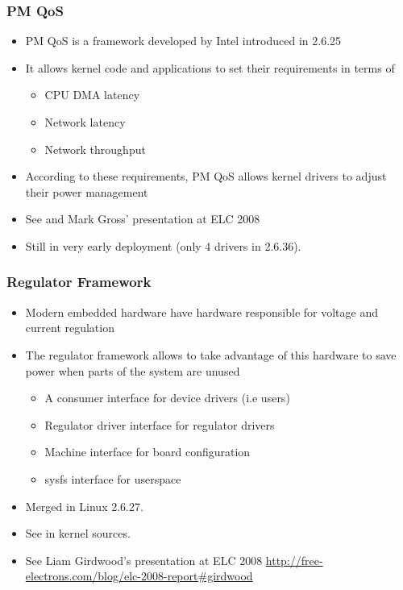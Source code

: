 \begin{frame}
  \frametitle{PM QoS}
  \begin{itemize}
  \item PM QoS is a framework developed by Intel introduced in 2.6.25
  \item It allows kernel code and applications to set their
    requirements in terms of
    \begin{itemize}
    \item CPU DMA latency
    \item Network latency
    \item Network throughput
    \end{itemize}
  \item According to these requirements, PM QoS allows kernel drivers
    to adjust their power management
  \item See  and Mark
    Gross' presentation at ELC 2008
  \item Still in very early deployment (only 4 drivers in 2.6.36).
  \end{itemize}
\end{frame}

\begin{frame}
  \frametitle{Regulator Framework}
  \begin{itemize}
  \item Modern embedded hardware have hardware responsible for voltage
    and current regulation
  \item The regulator framework allows to take advantage of this
    hardware to save power when parts of the system are unused
    \begin{itemize}
    \item A consumer interface for device drivers (i.e users)
    \item Regulator driver interface for regulator drivers
    \item Machine interface for board configuration
    \item sysfs interface for userspace
    \end{itemize}
  \item Merged in Linux 2.6.27.
  \item See  in kernel sources.
  \item See Liam Girdwood's presentation at ELC 2008
    \url{http://free-electrons.com/blog/elc-2008-report\#girdwood}
  \end{itemize}
\end{frame}


